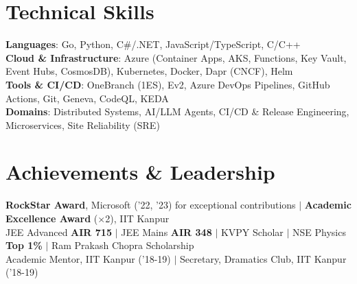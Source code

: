 \documentclass[a4paper,9pt]{extarticle}
\begin{document}
\section{Technical Skills}
 \begin{itemize}[leftmargin=0.15in, label={}]
    \small{\item{
     \textbf{Languages}{: Go, Python, C\#/.NET, JavaScript/TypeScript, C/C++} \\
     \textbf{Cloud \& Infrastructure}{: Azure (Container Apps, AKS, Functions, Key Vault, Event Hubs, CosmosDB), Kubernetes, Docker, Dapr (CNCF), Helm} \\
     \textbf{Tools \& CI/CD}{: OneBranch (1ES), Ev2, Azure DevOps Pipelines, GitHub Actions, Git, Geneva, CodeQL, KEDA} \\
     \textbf{Domains}{: Distributed Systems, AI/LLM Agents, CI/CD \& Release Engineering, Microservices, Site Reliability (SRE)}
    }}
 \end{itemize}

\section{Achievements \& Leadership}
 \begin{itemize}[leftmargin=0.15in, label={}]
    \small{\item{
      \textbf{RockStar Award}, Microsoft ('22, '23) for exceptional contributions $|$ \textbf{Academic Excellence Award} ($\times$2), IIT Kanpur \\
      JEE Advanced \textbf{AIR 715} $|$ JEE Mains \textbf{AIR 348} $|$ KVPY Scholar $|$ NSE Physics \textbf{Top 1\%} $|$ Ram Prakash Chopra Scholarship \\
      Academic Mentor, IIT Kanpur ('18-19) $|$ Secretary, Dramatics Club, IIT Kanpur ('18-19)
    }}
 \end{itemize}

\end{document}
